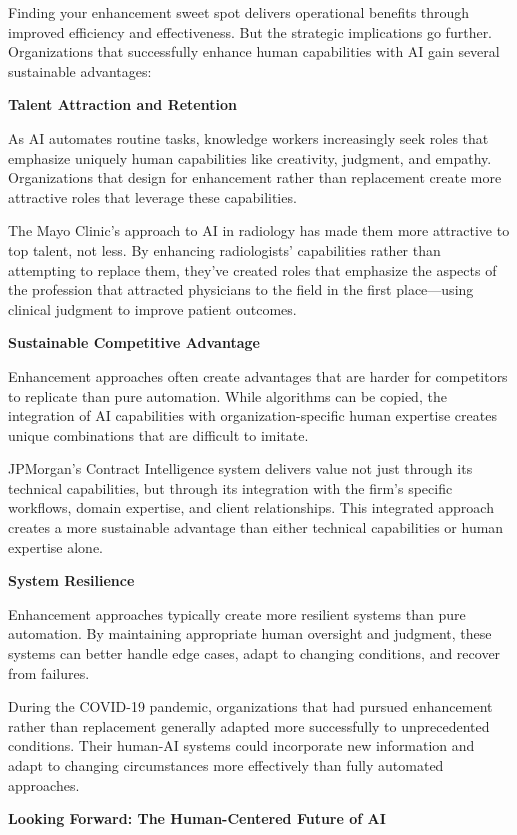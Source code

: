 \documentclass[
  Letterpaper,
]{scrbook}
\begin{document}
Finding your enhancement sweet spot delivers operational benefits
through improved efficiency and effectiveness. But the strategic
implications go further. Organizations that successfully enhance human
capabilities with AI gain several sustainable advantages:

\textbf{Talent Attraction and Retention}

As AI automates routine tasks, knowledge workers increasingly seek roles
that emphasize uniquely human capabilities like creativity, judgment,
and empathy. Organizations that design for enhancement rather than
replacement create more attractive roles that leverage these
capabilities.

The Mayo Clinic's approach to AI in radiology has made them more
attractive to top talent, not less. By enhancing radiologists'
capabilities rather than attempting to replace them, they've created
roles that emphasize the aspects of the profession that attracted
physicians to the field in the first place---using clinical judgment to
improve patient outcomes.

\textbf{Sustainable Competitive Advantage}

Enhancement approaches often create advantages that are harder for
competitors to replicate than pure automation. While algorithms can be
copied, the integration of AI capabilities with organization-specific
human expertise creates unique combinations that are difficult to
imitate.

JPMorgan's Contract Intelligence system delivers value not just through
its technical capabilities, but through its integration with the firm's
specific workflows, domain expertise, and client relationships. This
integrated approach creates a more sustainable advantage than either
technical capabilities or human expertise alone.

\textbf{System Resilience}

Enhancement approaches typically create more resilient systems than pure
automation. By maintaining appropriate human oversight and judgment,
these systems can better handle edge cases, adapt to changing
conditions, and recover from failures.

During the COVID-19 pandemic, organizations that had pursued enhancement
rather than replacement generally adapted more successfully to
unprecedented conditions. Their human-AI systems could incorporate new
information and adapt to changing circumstances more effectively than
fully automated approaches.

\textbf{Looking Forward: The Human-Centered Future of AI}
\end{document}
